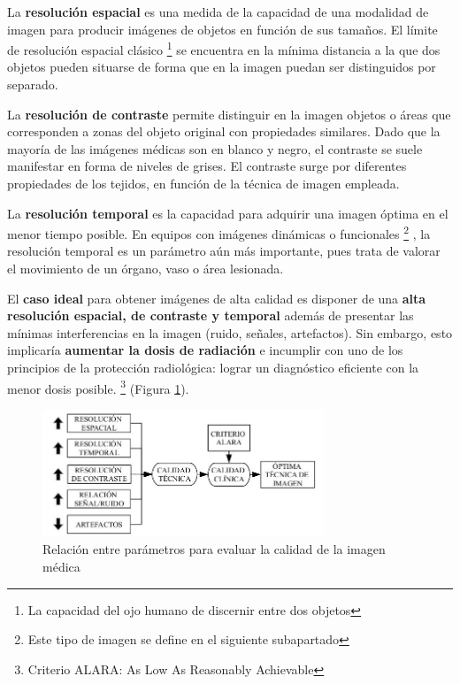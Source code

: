 \begin{definitionlist}
\item La \textbf{resolución espacial} es una medida de la capacidad de una modalidad de imagen para producir imágenes de objetos en función de sus tamaños. El límite de resolución espacial clásico \footnote{La capacidad del ojo humano de discernir entre dos objetos} se encuentra en la mínima distancia a la que dos objetos pueden situarse de forma que en la imagen puedan ser distinguidos por separado.
\item La \textbf{resolución de contraste} permite distinguir en la imagen objetos o áreas que corresponden a zonas del objeto original con propiedades similares. Dado que la mayoría de las imágenes médicas son en blanco y negro, el contraste se suele manifestar en forma de niveles de grises. El contraste surge por diferentes propiedades de los tejidos, en función de la técnica de imagen empleada.
\item La \textbf{resolución temporal} es la capacidad para adquirir una imagen óptima en el
menor tiempo posible. En equipos con imágenes dinámicas o funcionales \footnote{Este tipo de imagen se define en el siguiente subapartado} , la resolución temporal es un parámetro aún más importante, pues trata de valorar el movimiento de un órgano, vaso o área lesionada.
\end{definitionlist}

El \textbf{caso ideal} para obtener imágenes de alta calidad es disponer de una \textbf{alta resolución espacial, de contraste y temporal} además de presentar las mínimas interferencias en la imagen (ruido, señales, artefactos). Sin embargo, esto implicaría \textbf{aumentar la dosis de radiación} e incumplir con uno de los principios de la protección radiológica: lograr un diagnóstico eficiente con la menor dosis posible. \footnote{Criterio ALARA: As Low As Reasonably Achievable} (Figura \ref{fig:parametros}).

\begin{figure}[!h]
\begin{center}
\includegraphics[width=0.75\textwidth]{images/parametros_image.jpg}
\caption{Relación entre parámetros para evaluar la calidad de la imagen médica}
\label{fig:parametros}
\end{center}
\end{figure}

